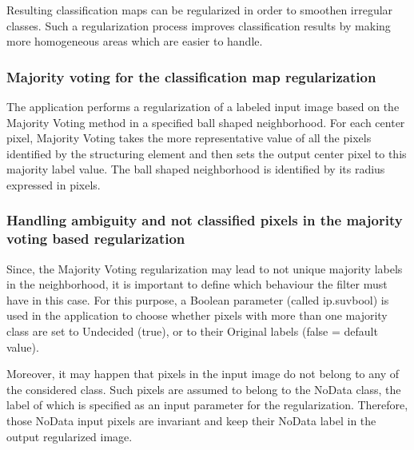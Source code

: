 Resulting classification maps can be regularized in order to smoothen irregular classes. Such a regularization process
improves classification results by making more homogeneous areas which are easier to handle.

\subsubsection{Majority voting for the classification map regularization}

The  application performs a regularization of a labeled input image
based on the Majority Voting method in a specified ball shaped neighborhood. For each center pixel, Majority Voting takes the
more representative value of all the pixels identified by the structuring element and then sets the output center pixel
to this majority label value. The ball shaped neighborhood is identified by its radius expressed in pixels.


\subsubsection{Handling ambiguity and not classified pixels in the majority voting based regularization}

Since, the Majority Voting regularization may lead to not unique majority labels in the neighborhood, it is important to define
which behaviour the filter must have in this case. For this purpose, a Boolean parameter (called ip.suvbool) is used in the
 application to choose whether pixels with more than one majority class are set to
Undecided (true), or to their Original labels (false = default value).

Moreover, it may happen that pixels in the input image do not belong to any of the considered class. Such pixels are
assumed to belong to the NoData class, the label of which is specified as an input parameter for the regularization. Therefore,
those NoData input pixels are invariant and keep their NoData label in the output regularized image.
 
